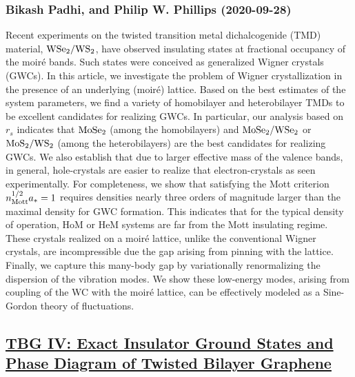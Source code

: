 \subsubsection*{Bikash Padhi, and Philip W. Phillips (2020-09-28)}
Recent experiments on the twisted transition metal dichalcogenide (TMD)
material, $\rm WSe_2/WS_2$, have observed insulating states at fractional
occupancy of the moir\'e bands. Such states were conceived as generalized
Wigner crystals (GWCs). In this article, we investigate the problem of Wigner
crystallization in the presence of an underlying (moir\'e) lattice. Based on
the best estimates of the system parameters, we find a variety of homobilayer
and heterobilayer TMDs to be excellent candidates for realizing GWCs. In
particular, our analysis based on $r_{s}$ indicates that $\rm MoSe_{2}$ (among
the homobilayers) and $\rm MoSe_2/WSe_2$ or $\rm MoS_2/ WS_2$ (among the
heterobilayers) are the best candidates for realizing GWCs. We also establish
that due to larger effective mass of the valence bands, in general,
hole-crystals are easier to realize that electron-crystals as seen
experimentally. For completeness, we show that satisfying the Mott criterion
$n_{\rm Mott}^{1/2} a_{\ast} = 1$ requires densities nearly three orders of
magnitude larger than the maximal density for GWC formation. This indicates
that for the typical density of operation, HoM or HeM systems are far from the
Mott insulating regime. These crystals realized on a moir\'e lattice, unlike
the conventional Wigner crystals, are incompressible due the gap arising from
pinning with the lattice. Finally, we capture this many-body gap by
variationally renormalizing the dispersion of the vibration modes. We show
these low-energy modes, arising from coupling of the WC with the moir\'e
lattice, can be effectively modeled as a Sine-Gordon theory of fluctuations.

\subsection*{\href{http://arxiv.org/abs/2009.13530v1}{TBG IV: Exact Insulator Ground States and Phase Diagram of Twisted  Bilayer Graphene}}
